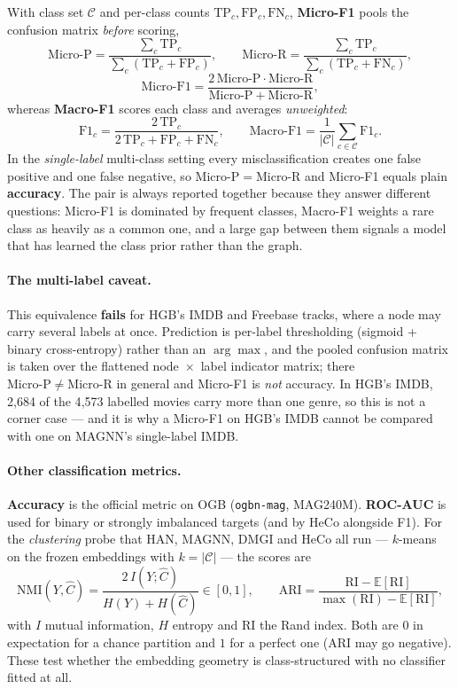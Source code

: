 With class set $\mathcal{C}$ and per-class counts $\mathrm{TP}_c,\mathrm{FP}_c,\mathrm{FN}_c$,
\textbf{Micro-F1} pools the confusion matrix \emph{before} scoring,
\[
  \mathrm{Micro\text{-}P}=\frac{\sum_{c}\mathrm{TP}_c}{\sum_{c}(\mathrm{TP}_c+\mathrm{FP}_c)},
  \qquad
  \mathrm{Micro\text{-}R}=\frac{\sum_{c}\mathrm{TP}_c}{\sum_{c}(\mathrm{TP}_c+\mathrm{FN}_c)},
\]
\[
  \mathrm{Micro\text{-}F1}
   =\frac{2\,\mathrm{Micro\text{-}P}\cdot\mathrm{Micro\text{-}R}}
          {\mathrm{Micro\text{-}P}+\mathrm{Micro\text{-}R}},
\]
whereas \textbf{Macro-F1} scores each class and averages \emph{unweighted}:
\[
  \mathrm{F1}_c=\frac{2\,\mathrm{TP}_c}{2\,\mathrm{TP}_c+\mathrm{FP}_c+\mathrm{FN}_c},
  \qquad
  \mathrm{Macro\text{-}F1}=\frac{1}{|\mathcal{C}|}\sum_{c\in\mathcal{C}}\mathrm{F1}_c .
\]
In the \emph{single-label} multi-class setting every misclassification creates one false positive
and one false negative, so $\mathrm{Micro\text{-}P}=\mathrm{Micro\text{-}R}$ and Micro-F1 equals
plain \textbf{accuracy}. The pair is always reported together because they answer different
questions: Micro-F1 is dominated by frequent classes, Macro-F1 weights a rare class as heavily as a
common one, and a large gap between them signals a model that has learned the class prior rather
than the graph.

\paragraph{The multi-label caveat.} This equivalence \textbf{fails} for HGB's IMDB and Freebase
tracks, where a node may carry several labels at once. Prediction is per-label thresholding (sigmoid
+ binary cross-entropy) rather than an $\arg\max$, and the pooled confusion matrix is taken over the
flattened node~$\times$~label indicator matrix; there $\mathrm{Micro\text{-}P}\neq
\mathrm{Micro\text{-}R}$ in general and Micro-F1 is \emph{not} accuracy. In HGB's IMDB, 2{,}684 of
the 4{,}573 labelled movies carry more than one genre, so this is not a corner case --- and it is
why a Micro-F1 on HGB's IMDB cannot be compared with one on MAGNN's single-label IMDB.

\paragraph{Other classification metrics.} \textbf{Accuracy} is the official metric on OGB
(\texttt{ogbn-mag}, MAG240M). \textbf{ROC-AUC} is used for binary or strongly imbalanced targets
(and by HeCo alongside F1). For the \emph{clustering} probe that HAN, MAGNN, DMGI and HeCo all run
--- $k$-means on the frozen embeddings with $k=|\mathcal{C}|$ --- the scores are
\[
  \mathrm{NMI}(Y,\hat{C})=\frac{2\,I(Y;\hat{C})}{H(Y)+H(\hat{C})}\in[0,1],
  \qquad
  \mathrm{ARI}=\frac{\mathrm{RI}-\mathbb{E}[\mathrm{RI}]}
                    {\max(\mathrm{RI})-\mathbb{E}[\mathrm{RI}]},
\]
with $I$ mutual information, $H$ entropy and $\mathrm{RI}$ the Rand index. Both are $0$ in
expectation for a chance partition and $1$ for a perfect one (ARI may go negative). These test
whether the embedding geometry is class-structured with no classifier fitted at all.

